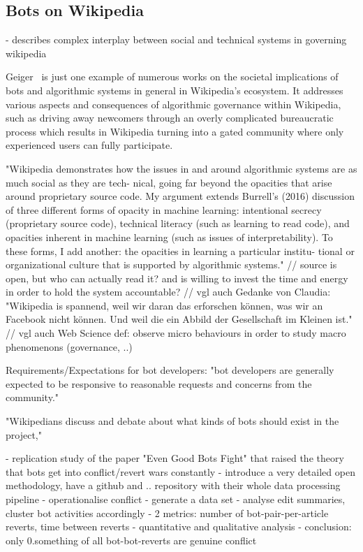 \documentclass[pdftex,a4paper,11pt]{scrartcl}
\begin{document}
\subsection{Bots on Wikipedia}
\cite{Geiger2017}
- describes complex interplay between social and technical systems in governing wikipedia

  Geiger~\cite{Geiger2017} is just one example of numerous works on the societal implications of bots and algorithmic systems in general in Wikipedia's ecosystem.
  It addresses various aspects and consequences of algorithmic governance within Wikipedia, such as driving away newcomers through an overly complicated bureaucratic process which results in Wikipedia turning into a gated community where only experienced users can fully participate.

"Wikipedia demonstrates how the issues in and around
algorithmic systems are as much social as they are tech-
nical, going far beyond the opacities that arise around
proprietary source code. My argument extends Burrell’s
(2016) discussion of three different forms of opacity in
machine learning: intentional secrecy (proprietary
source code), technical literacy (such as learning to
read code), and opacities inherent in machine learning
(such as issues of interpretability). To these forms, I add
another: the opacities in learning a particular institu-
tional or organizational culture that is supported by
algorithmic systems."
// source is open, but who can actually read it? and is willing to invest the time and energy in order to hold the system accountable?
// vgl auch Gedanke von Claudia: "Wikipedia is spannend, weil wir daran das erforschen können, was wir an Facebook nicht können. Und weil die ein Abbild der Gesellschaft im Kleinen ist."
// vgl auch Web Science def: observe micro behaviours in order to study macro phenomenons (governance, ..)

Requirements/Expectations for bot developers:
"bot developers are generally expected to be responsive
to reasonable requests and concerns from the
community."

"Wikipedians discuss and debate
about what kinds of bots should exist in the project,"

\cite{GeiHal2017}
- replication study of the paper "Even Good Bots Fight" that raised the theory
  that bots get into conflict/revert wars constantly
- introduce a very detailed open methodology, have a github and .. repository
  with their whole data processing pipeline
- operationalise conflict
- generate a data set
- analyse edit summaries, cluster bot activities accordingly
- 2 metrics: number of bot-pair-per-article reverts, time between reverts
- quantitative and qualitative analysis
- conclusion: only 0.something of all bot-bot-reverts are genuine conflict
\end{document}

